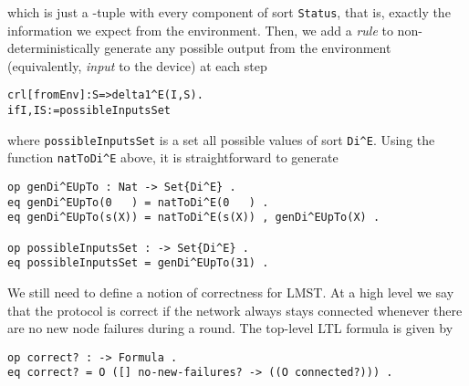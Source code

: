 \documentclass[copyright,creativecommons]{eptcs}
\begin{document}
\noindent
which is just a -tuple with every component of sort {\tt Status}, that is,
exactly the information we expect from the environment. Then, we add a
\emph{rule} to non-deterministically generate any possible output from the
environment (equivalently, \emph{input} to the device) at each step

\begin{center}
\begin{small}
\begin{boxedminipage}{0.60\textwidth}
\begin{alltt}
crl [fromEnv] : S => delta1^E(I, S) .
 if I,IS := possibleInputsSet
\end{alltt}
\end{boxedminipage}
\end{small}
\end{center}

\noindent
where {\tt possibleInputsSet} is a set all possible values of sort {\tt Di\^{}E}.
Using the function {\tt natToDi\^{}E} above, it is straightforward to generate

\begin{center}
\begin{small}
\begin{boxedminipage}{0.75\textwidth}
\begin{verbatim}
op genDi^EUpTo : Nat -> Set{Di^E} .
eq genDi^EUpTo(0   ) = natToDi^E(0   ) .
eq genDi^EUpTo(s(X)) = natToDi^E(s(X)) , genDi^EUpTo(X) .

op possibleInputsSet : -> Set{Di^E} .
eq possibleInputsSet = genDi^EUpTo(31) .
\end{verbatim}
\end{boxedminipage}
\end{small}
\end{center}


We still need to define a notion of correctness for LMST. At a high level we
say that the protocol is correct if the network always stays connected whenever
there are no new node failures during a round. The top-level LTL formula is
given by

\begin{center}
\begin{small}
\begin{boxedminipage}{0.70\textwidth}
\begin{verbatim}
op correct? : -> Formula .
eq correct? = O ([] no-new-failures? -> ((O connected?))) .
\end{verbatim}
\end{boxedminipage}
\end{small}
\end{center}
\end{document}
